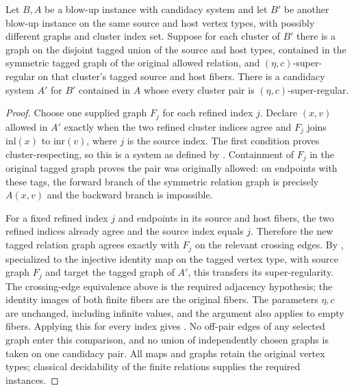 \begin{lemma}
Let $B,A$ be a blow-up instance with candidacy system and let $B'$
be another blow-up instance on the same source and host vertex types,
with possibly different graphs and cluster index set. Suppose for
each cluster of $B'$ there is a graph on the disjoint tagged union
of the source and host types, contained in the symmetric tagged
graph of the original allowed relation, and
$(\eta,c)$-super-regular on that cluster's tagged source and host
fibers. There is a candidacy system $A'$ for $B'$ contained in $A$
whose every cluster pair is $(\eta,c)$-super-regular.
\end{lemma}
\begin{proof}
Choose one supplied graph $F_j$ for each refined index $j$.
Declare $(x,v)$ allowed in $A'$ exactly when the two refined
cluster indices agree and $F_j$ joins $\mathrm{inl}(x)$ to
$\mathrm{inr}(v)$, where $j$ is the source index. The first
condition proves cluster-respecting, so this is a system as defined
by . Containment of $F_j$ in the original
tagged graph proves the pair was originally allowed: on endpoints
with these tags, the forward branch of the symmetric relation graph
is precisely $A(x,v)$ and the backward branch is impossible.

For a fixed refined index $j$ and endpoints in its source and host
fibers, the two refined indices already agree and the source index
equals $j$. Therefore the new tagged relation graph agrees exactly
with $F_j$ on the relevant crossing edges. By
, specialized to the injective
identity map on the tagged vertex type, with source graph $F_j$ and
target the tagged graph of $A'$, this transfers its super-regularity.
The crossing-edge equivalence above is the required adjacency hypothesis;
the identity images of both finite fibers are the original fibers.
The parameters $\eta,c$ are unchanged, including infinite values, and
the argument also applies to empty fibers. Applying this for
every index gives . No off-pair
edges of any selected graph enter this comparison, and no union of
independently chosen graphs is taken on one candidacy pair.
All maps and graphs retain the original vertex types; classical
decidability of the finite relations supplies the required instances.
\end{proof}
